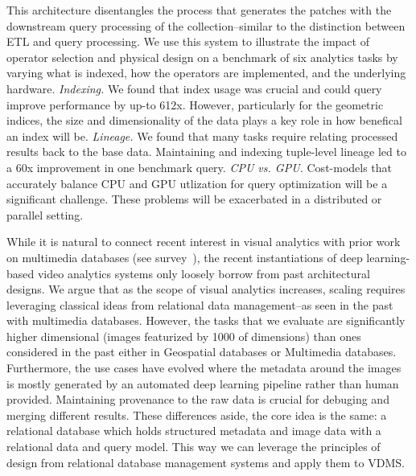 This architecture disentangles the process that generates the patches with the downstream query processing of the collection--similar to the distinction between ETL and query processing.
We use this system to illustrate the impact of operator selection and physical design on a benchmark of six analytics tasks by varying what is indexed, how the operators are implemented, and the underlying hardware.
\emph{Indexing. } We found that index usage was crucial and could query improve performance by up-to 612x. However, particularly for the geometric indices, the size and dimensionality of the data plays a key role in how benefical an index will be.
\emph{Lineage. } We found that many tasks require relating processed results back to the base data.
Maintaining and indexing tuple-level lineage led to a 60x improvement in one benchmark query.
\emph{CPU vs. GPU. } Cost-models that accurately balance CPU and GPU utlization for query optimization will be a significant challenge. These problems will be exacerbated in a distributed or parallel setting.


While it is natural to connect recent interest in visual analytics with prior work on multimedia databases (see survey~\cite{yoshitaka1999survey}), the recent instantiations of deep learning-based video analytics systems only loosely borrow from past architectural designs.
We argue that as the scope of visual analytics increases, scaling requires leveraging classical ideas from relational data management--as seen in the past with multimedia databases.
However, the tasks that we evaluate are significantly higher dimensional (images featurized by 1000 of dimensions) than ones considered in the past either in Geospatial databases or Multimedia databases.
Furthermore, the use cases have evolved where the metadata around the images is mostly generated by an automated deep learning pipeline rather than human provided.
Maintaining provenance to the raw data is crucial for debuging and merging different results. 
These differences aside, the core idea is the same: a relational database which holds structured metadata and image data with a relational data and query model. 
This way we can leverage the principles of design from relational database management systems and apply them to VDMS.











